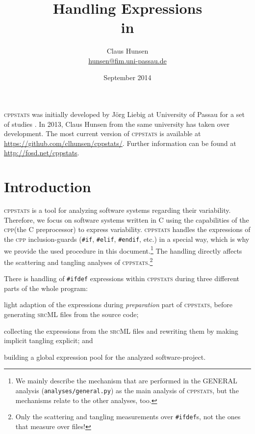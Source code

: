 \documentclass[a4paper]{scrartcl}
\title{Handling \ifdef Expressions\\in \cppstats}
\author{Claus Hunsen\\\url{hunsen@fim.uni-passau.de}}
\date{September 2014}
\newcommand\code[1]{\texttt{#1}}
\newcommand\tool[1]{\textsc{#1}}
\newcommand\ifdeff[1]{\code{\##1}\xspace}
\newcommand\ifdef[0]{{\upshape\ifdeff{ifdef}}\xspace}
\newcommand\ifdefs[0]{\ifdef{}s\xspace}
\newcommand\cppstats[0]{\tool{cppstats}\xspace}
\newcommand\cpp{\tool{cpp}\xspace}
\begin{document}
\maketitle



\begin{footnotesize}
\noindent \cppstats was initially developed by J\"org Liebig at University of Passau for a set of studies \cite{LiebigALKS10,LiebigKA11}.
In 2013, Claus Hunsen from the same university has taken over development.
The most current version of \cppstats is available at \url{https://github.com/clhunsen/cppstats/}.
Further information can be found at \url{http://fosd.net/cppstats}.
\end{footnotesize}

\section{Introduction}
\cppstats is a tool for analyzing software systems regarding their variability.
Therefore, we focus on software systems written in \tool{C} using the capabilities of the \cpp (the \tool{C} preprocessor) to express variability.
\cppstats handles the expressions of the \cpp inclusion-guards (\ifdeff{if}, \ifdeff{elif}, \ifdeff{endif}, etc.) in a special way, which is why we provide the used procedure in this document.\footnote{We mainly describe the mechanism that are performed in the \tool{GENERAL} analysis (\code{analyses/general.py}) as the main analysis of \cppstats, but the mechanisms relate to the other analyses, too.}
The handling directly affects the scattering and tangling analyses of \cppstats.\footnote{Only the scattering and tangling measurements over \ifdefs, not the ones that measure over files!}

There is handling of \ifdef expressions within \cppstats during three different parts of the whole program:
\begin{inparaenum}[\itshape 1\upshape)]
\item light adaption of the expressions during \textit{preparation} part of \cppstats, before generating \tool{srcML} files from the source code;
\item collecting the expressions from the \tool{srcML} files and rewriting them by making implicit tangling explicit; and
\item building a global expression pool for the analyzed software-project.
\end{inparaenum}
\end{document}

